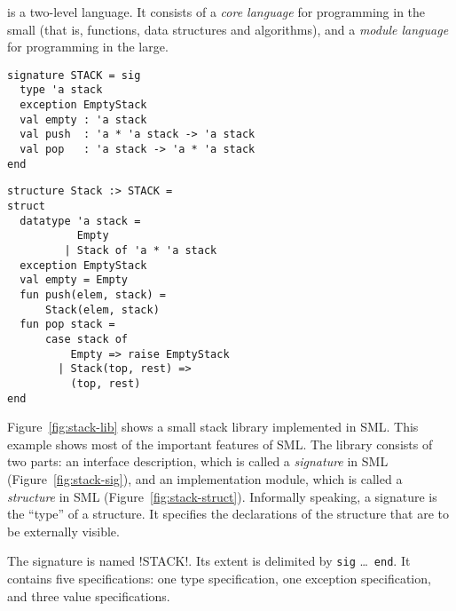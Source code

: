 \documentclass[finalversion]{usetex-v1}
\begin{document}
\sml{} is a two-level language. It consists of a \emph{core language}
for programming in the small (that is, functions, data structures and
algorithms), and a \emph{module language} for programming in the large.


\begin{figure*}[thp]
\mbox{}\hfill{}

\begin{subfloat}
\begin{minipage}[b]{.46\linewidth}
\begin{verbatim}
signature STACK = sig 
  type 'a stack
  exception EmptyStack
  val empty : 'a stack
  val push  : 'a * 'a stack -> 'a stack
  val pop   : 'a stack -> 'a * 'a stack
end
\end{verbatim}
\end{minipage}
\caption{\label{fig:stack-sig}interface}
\end{subfloat}
\qquad
\begin{subfloat}
\begin{minipage}[b]{.46\linewidth}
\begin{verbatim}
structure Stack :> STACK =
struct
  datatype 'a stack =
           Empty
         | Stack of 'a * 'a stack
  exception EmptyStack
  val empty = Empty
  fun push(elem, stack) = 
      Stack(elem, stack)
  fun pop stack =
      case stack of
          Empty => raise EmptyStack
        | Stack(top, rest) => 
          (top, rest)
end
\end{verbatim}
\end{minipage}
\caption{\label{fig:stack-struct}implementation}
\end{subfloat}
\hfill\mbox{}
\caption{Simple stack library implemented in SML.}
  \label{fig:stack-lib}
\end{figure*}

Figure~\ref{fig:stack-lib} shows a small stack library implemented in
SML.  This example shows most of the important features of SML.  The
library consists of two parts: an interface description, which is
called a \emph{signature} in SML (Figure~\ref{fig:stack-sig}), and an
implementation module, which is called a \emph{structure} in SML
(Figure~\ref{fig:stack-struct}).  Informally speaking, a
signature is the ``type'' of a structure. It specifies the
declarations of the structure that are to be externally visible.


The signature is named !STACK!. Its extent is delimited by
\texttt{sig} \ldots\ \texttt{end}. It contains five
specifications: one type specification, one exception specification,
and three value specifications.
\end{document}
